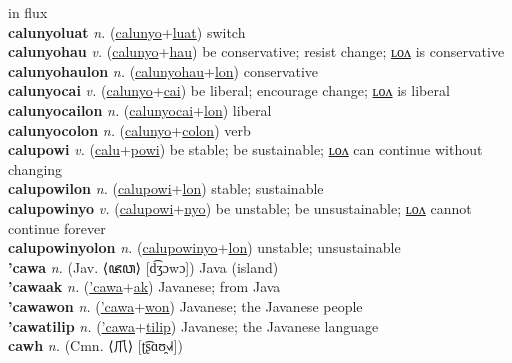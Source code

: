 in flux \label{calunyolon} \\
\textbf{calunyoluat} \textit{n.} (\hyperref[calunyo]{calunyo}+\hyperref[luat]{luat})
switch \label{calunyoluat} \\
\textbf{calunyohau} \textit{v.} (\hyperref[calunyo]{calunyo}+\hyperref[hau]{hau})
be conservative; resist change; \hyperref[calunyohaulon]{ʟᴏᴧ} is conservative \label{calunyohau} \\
\textbf{calunyohaulon} \textit{n.} (\hyperref[calunyohau]{calunyohau}+\hyperref[lon]{lon})
conservative \label{calunyohaulon} \\
\textbf{calunyocai} \textit{v.} (\hyperref[calunyo]{calunyo}+\hyperref[cai]{cai})
be liberal; encourage change; \hyperref[calunyocailon]{ʟᴏᴧ} is liberal \label{calunyocai} \\
\textbf{calunyocailon} \textit{n.} (\hyperref[calunyocai]{calunyocai}+\hyperref[lon]{lon})
liberal \label{calunyocailon} \\
\textbf{calunyocolon} \textit{n.} (\hyperref[calunyo]{calunyo}+\hyperref[colon]{colon})
verb \label{calunyocolon} \\
\textbf{calupowi} \textit{v.} (\hyperref[calu]{calu}+\hyperref[powi]{powi})
be stable; be sustainable; \hyperref[calupowilon]{ʟᴏᴧ} can continue without changing \label{calupowi} \\
\textbf{calupowilon} \textit{n.} (\hyperref[calupowi]{calupowi}+\hyperref[lon]{lon})
stable; sustainable \label{calupowilon} \\
\textbf{calupowinyo} \textit{v.} (\hyperref[calupowi]{calupowi}+\hyperref[nyo]{nyo})
be unstable; be unsustainable; \hyperref[calupowinyolon]{ʟᴏᴧ} cannot continue forever \label{calupowinyo} \\
\textbf{calupowinyolon} \textit{n.} (\hyperref[calupowinyo]{calupowinyo}+\hyperref[lon]{lon})
unstable; unsustainable \label{calupowinyolon} \\
\textbf{'cawa} \textit{n.} (Jav. ⟨ꦗꦮ⟩ [d͡ʒɔwɔ])
Java (island) \label{'cawa} \\
\textbf{'cawaak} \textit{n.} (\hyperref['cawa]{'cawa}+\hyperref[ak]{ak})
Javanese; from Java \label{'cawaak} \\
\textbf{'cawawon} \textit{n.} (\hyperref['cawa]{'cawa}+\hyperref[won]{won})
Javanese; the Javanese people \label{'cawawon} \\
\textbf{'cawatilip} \textit{n.} (\hyperref['cawa]{'cawa}+\hyperref[tilip]{tilip})
Javanese; the Javanese language \label{'cawatilip} \\
\textbf{cawh} \textit{n.} (Cmn. ⟨爪⟩ [ʈ͡ʂɑʊ̯˧˩˧])
